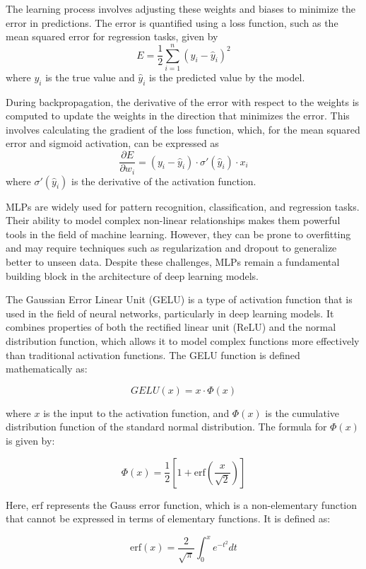 \begin{spacing}{1.5}
\begin{sloppypar}
The learning process involves adjusting these weights and biases to minimize the error in predictions. The error is quantified using a loss function, such as the mean squared error for regression tasks, given by $$E = \frac{1}{2}\sum_{i=1}^{n} (y_i - \hat{y}_i)^2$$ where \(y_i\) is the true value and \(\hat{y}_i\) is the predicted value by the model.

During backpropagation, the derivative of the error with respect to the weights is computed to update the weights in the direction that minimizes the error. This involves calculating the gradient of the loss function, which, for the mean squared error and sigmoid activation, can be expressed as $$\frac{\partial E}{\partial w_i} = (y_i - \hat{y}_i) \cdot \sigma'(\hat{y}_i) \cdot x_i$$ where \(\sigma'(\hat{y}_i)\) is the derivative of the activation function.

MLPs are widely used for pattern recognition, classification, and regression tasks. Their ability to model complex non-linear relationships makes them powerful tools in the field of machine learning. However, they can be prone to overfitting and may require techniques such as regularization and dropout to generalize better to unseen data. Despite these challenges, MLPs remain a fundamental building block in the architecture of deep learning models.

The Gaussian Error Linear Unit (GELU) is a type of activation function that is used in the field of neural networks, particularly in deep learning models. It combines properties of both the rectified linear unit (ReLU) and the normal distribution function, which allows it to model complex functions more effectively than traditional activation functions. The GELU function is defined mathematically as:

$$ GELU(x) = x \cdot \Phi(x) $$

where \( x \) is the input to the activation function, and \( \Phi(x) \) is the cumulative distribution function of the standard normal distribution. The formula for \( \Phi(x) \) is given by:

$$ \Phi(x) = \frac{1}{2} \left[1 + \text{erf}\left(\frac{x}{\sqrt{2}}\right)\right] $$

Here, \( \text{erf} \) represents the Gauss error function, which is a non-elementary function that cannot be expressed in terms of elementary functions. It is defined as:

$$ \text{erf}(x) = \frac{2}{\sqrt{\pi}} \int_{0}^{x} e^{-t^2} dt $$


\end{sloppypar}
\end{spacing}
